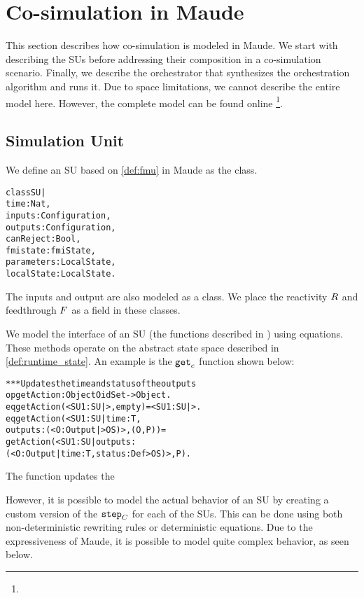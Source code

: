 \section{Co-simulation in Maude}
This section describes how co-simulation is modeled in Maude.
We start with describing the SUs before addressing their composition in a co-simulation scenario. Finally, we describe the orchestrator that synthesizes the orchestration algorithm and runs it.
Due to space limitations, we cannot describe the entire model here. 
However, the complete model can be found online \footnote{}.

\subsection{Simulation Unit}
We define an SU based on \cref{def:fmu} in Maude as the class.

\begin{alltt}
\small
class SU |
  time : Nat, 
  inputs : Configuration, 
  outputs : Configuration,
  canReject : Bool, 
  fmistate : fmiState,
  parameters : LocalState,
  localState : LocalState .
\end{alltt}

The inputs and output are also modeled as a class. 
We place the reactivity $R$ and feedthrough $F$ as a field in these classes.

We model the interface of an SU (the functions described in ) using equations.
These methods operate on the abstract state space described in \cref{def:runtime_state}.
An example is the $\mathtt{get}_{c}$ function shown below:

\begin{alltt}
  \small
  *** Updates the time and status of the outputs
  op getAction : Object OidSet -> Object .
  eq getAction(< SU1 : SU | >, empty) = < SU1 : SU | > .
  eq getAction(< SU1 : SU | time : T, 
    outputs : (< O : Output | > OS) >, (O , P)) = 
    getAction(< SU1 : SU | outputs : 
    (< O : Output | time : T, status : Def > OS) >, P) .
\end{alltt}

The function updates the 

However, it is possible to model the actual behavior of an SU by creating a custom version of the $\mathtt{step}_{C}$ for each of the SUs. 
This can be done using both non-deterministic rewriting rules or deterministic equations.
Due to the expressiveness of Maude, it is possible to model quite complex behavior, as seen below.

